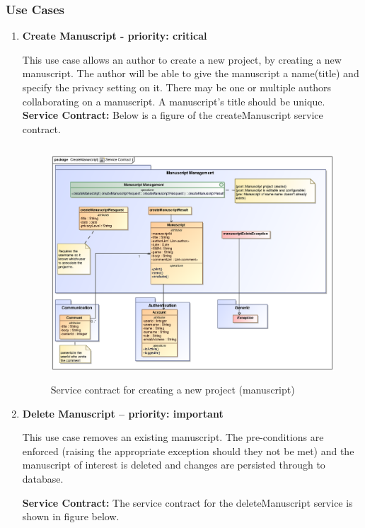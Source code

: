 \subsubsection{Use Cases}
\begin{enumerate}
\item \textbf{Create Manuscript - priority: critical}

\par{This use case allows an author to create a new project, by creating a new manuscript. The author will be able to give the manuscript a name(title) and specify the privacy setting on it. There may be one or multiple authors collaborating on a manuscript.
A manuscript's title should be unique.}\\

\textbf{Service Contract:} Below is a figure of the createManuscript service contract.

\begin{figure}[h]
\includegraphics[height=330px, width=500px]{epsImages/ManuscriptManagement/createManuscriptServiceContract.eps}
\caption{Service contract for creating a new project (manuscript)}
\end{figure}

\newpage
\item \textbf{Delete Manuscript – priority: important}
\par{This use case removes an existing manuscript. The pre-conditions are enforced (raising the appropriate exception should they not be met) and the manuscript of interest is deleted and changes are persisted through to database.}

\par{\textbf{Service Contract:} 
The service contract for the deleteManuscript  service is shown in figure below. }


\end{enumerate}
